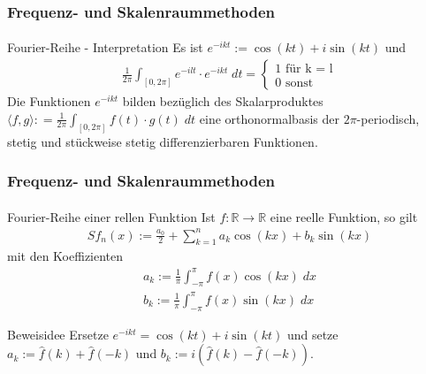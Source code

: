 \documentclass{beamer}
\begin{document}
\begin{frame}
    \frametitle{Frequenz- und Skalenraummethoden}
\framesubtitle{}

\begin{block}{Fourier-Reihe - Interpretation}
Es ist $e^{-ikt} := \cos (k t) + i \sin(kt)$ und 
\begin{align*}
  \frac{1}{2 \pi}  \int_{[0, 2 \pi]}  e^{-ilt} \cdot e^{-ikt} \; dt = \begin{cases} 1 \text{ für k = l}  \\ 0 \text{ sonst }\end{cases}
\end{align*}
Die Funktionen  $e^{-ikt}$ bilden bezüglich des Skalarproduktes $\langle f, g \rangle : =\frac{1}{2 \pi}  \int_{[0, 2 \pi]}  f(t) \cdot g(t) \; dt$ eine orthonormalbasis der $2\pi$-periodisch, stetig und stückweise stetig differenzierbaren Funktionen.
\end{block}
 \end{frame}


\begin{frame}
    \frametitle{Frequenz- und Skalenraummethoden}
\framesubtitle{}

\begin{block}{Fourier-Reihe einer rellen Funktion}
Ist $f :\mathbb{R} \to \mathbb{R}$ eine reelle Funktion, so gilt
\begin{align*}
Sf_n(x) := \frac{a_0}{2} + \sum_{k= 1}^{n} a_k \cos (kx) + b_k \sin (kx)  
\end{align*}
mit den Koeffizienten
\begin{align*}
a_k := \frac{1}{ \pi} \int_{-\pi}^{\pi} f(x) \cos (kx)\; dx \\
b_k := \frac{1}{ \pi} \int_{-\pi}^{\pi} f(x) \sin (kx)\; dx
\end{align*}

\end{block}
\begin{block}{Beweisidee}
Ersetze   $e^{-ikt} = \cos(kt) + i \sin (kt)$ und setze $a_k := \hat{f}(k) + \hat{f}(-k)$ und $b_k :=  i(\hat{f}(k) - \hat{f}(-k))$.
\end{block}
 \end{frame}
\end{document}
